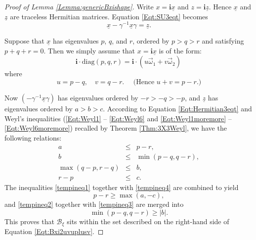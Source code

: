 \documentclass[12pt]{amsart}
\theoremstyle{definition}
\numberwithin{equation}{section}
\def\diag{\mathrm{diag}}
\newcommand{\abs}[1]{\lvert#1\rvert}
\newcommand{\imagunit}{\mathbf{i}}
\newcommand{\Bxi}{\mathcal{B}_{\xi}}
\begin{document}
\begin{proof}[Proof of Lemma \ref{Lemma:genericBxishape}] Write $x=\imagunit \underline{x}$ and $z=\imagunit \underline{z}$. Hence $\underline{x}$ and $\underline{z}$ are traceless Hermitian matrices. Equation \eqref{Eqt:SU3eqt} becomes
  \begin{equation}
	\label{Eqt:Hermitian3eqt}
	\underline{x} - {\gamma^{-1}}\underline{x}\gamma = \underline{z}.
\end{equation}

Suppose that $\underline{x}$ has eigenvalues $p$, $q$, and $r$, ordered by $p> q> r$ and satisfying  $p+q+r=0$. Then we simply assume that $x=\imagunit \underline{x}$ is of the form: \begin{equation}\label{Eqt:xinpqr}\imagunit\cdot \diag(p,q,r)=\imagunit\cdot (u\vec{\omega}_1+ v\vec{\omega}_2)\, \end{equation}
where
\begin{equation}\label{Eqt:uvpqr} u= {p-q} ,\quad v= {q-r} .\quad \mbox{ (Hence  } u+v=p-r.)
\end{equation}

Now $(-\gamma^{-1}\underline{x}\gamma)$ has eigenvalues ordered by  $-r> -q> -p$, and $\underline{z}$ has eigenvalues   ordered by $a> b> c$. According to Equation \eqref{Eqt:Hermitian3eqt} and   Weyl's inequalities (\eqref{Eqt:Weyl1} -- \eqref{Eqt:Weyl6} and \eqref{Eqt:Weyl1moremore} -- \eqref{Eqt:Weyl6moremore}) recalled by Theorem \ref{Thm:3X3Weyl},   we have
the following relations:
\begin{eqnarray}\label{tempineq1}
  a &\leqslant &  p-r, \\\label{tempineq2}
  b &\leqslant & \min(p-q,q-r) ,\\\label{tempineq3}
  \max(q-p,r-q) &\leqslant & b,\\\label{tempineq4}
  r-p &\leqslant& c.
\end{eqnarray}
The inequalities \eqref{tempineq1} together with \eqref{tempineq4} are combined to yield 
\begin{equation}\label{Eqt:p-r}
   p-r\geqslant \max(a,-c),
\end{equation}
and \eqref{tempineq2} together with \eqref{tempineq3} are merged into\begin{equation}\label{Eqt:p-qq-r} \min(p-q,q-r)\geqslant \abs{b}.\end{equation}
This proves that $\Bxi $ sits within the set described on the right-hand side of Equation \eqref{Eqt:Bxi2uvuplusv}.  


\end{proof}
\end{document}
